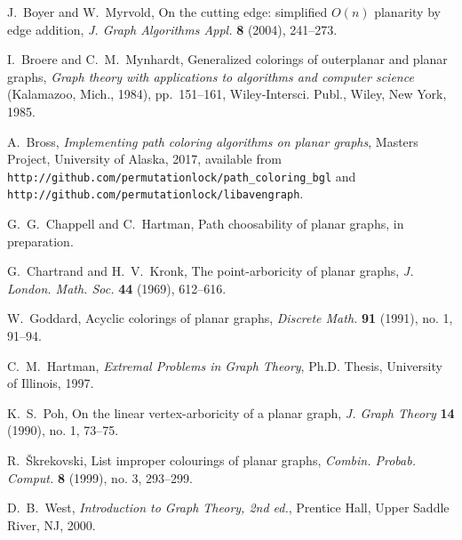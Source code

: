\documentclass[12pt,letterpaper]{article}
\theoremstyle{plain}
\theoremstyle{definition}
\theoremstyle{break}
\begin{document}
\begin{thebibliography}{99}

J.~Boyer and W.~Myrvold, On the cutting edge: simplified $O(n)$ planarity by edge
addition,
\textit{J. Graph Algorithms Appl.}
\textbf{8} (2004),
241--273.

I.~Broere and C.~M.~Mynhardt,
Generalized colorings of outerplanar and planar graphs,
\textit{Graph theory with applications to algorithms and computer science}
 (Kalamazoo, Mich., 1984),
pp.~151--161,
Wiley-Intersci. Publ., Wiley, New York, 1985.

A.~Bross,
\textit{Implementing path coloring algorithms on planar graphs},
Masters Project,
University of Alaska,
2017,
available from\hfil\break
\texttt{http://github.com/permutationlock/path\_coloring\_bgl} and\hfil\break
\texttt{http://github.com/permutationlock/libavengraph}.

G.~G.~Chappell and C.~Hartman,
Path choosability of planar graphs,
in preparation.

G.~Chartrand and H.~V.~Kronk,
The point-arboricity of planar graphs,
\textit{J. London. Math. Soc.}
\textbf{44} (1969),
612--616.

W.~Goddard,
Acyclic colorings of planar graphs,
\textit{Discrete Math.}
\textbf{91} (1991), no. 1,
91--94.

C.~M.~Hartman,
\textit{Extremal Problems in Graph Theory},
Ph.D. Thesis,
University of Illinois,
1997.

K.~S.~Poh,
On the linear vertex-arboricity of a planar graph,
\textit{J. Graph Theory}
\textbf{14} (1990), no. 1,
73--75.

R.~\v{S}krekovski,
List improper colourings of planar graphs,
\textit{Combin. Probab. Comput.}
\textbf{8} (1999), no. 3,
293--299.

D.~B.~West,
\textit{Introduction to Graph Theory, 2nd ed.},
Prentice Hall,
Upper Saddle River, NJ,
2000.

\end{thebibliography}
\end{document}
